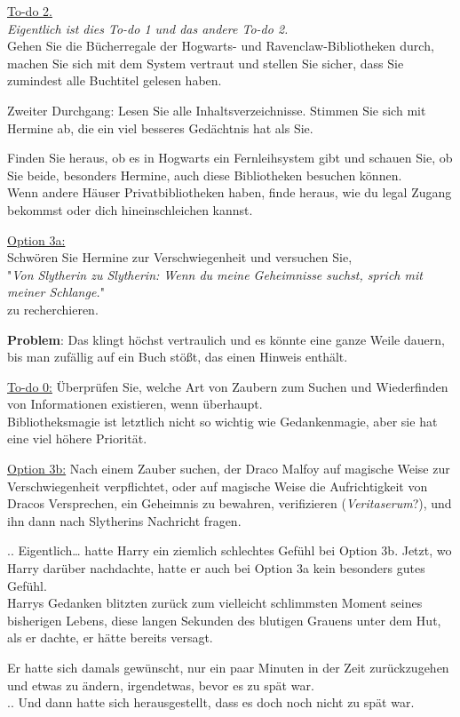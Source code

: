 {\uline{To-do 2.}\\ \emph{Eigentlich ist dies To-do 1 und das andere To-do 2.}\\ Gehen Sie die Bücherregale der Hogwarts- und Ravenclaw-Bibliotheken durch, machen Sie sich mit dem System vertraut und stellen Sie sicher, dass Sie zumindest alle Buchtitel gelesen haben.

Zweiter Durchgang: Lesen Sie alle Inhaltsverzeichnisse. Stimmen Sie sich mit Hermine ab, die ein viel besseres Gedächtnis hat als Sie.

Finden Sie heraus, ob es in Hogwarts ein Fernleihsystem gibt und schauen Sie, ob Sie beide, besonders Hermine, auch diese Bibliotheken besuchen können.\\ Wenn andere Häuser Privatbibliotheken haben, finde heraus, wie du legal Zugang bekommst oder dich hineinschleichen kannst.

\uline{Option 3a:}\\ Schwören Sie Hermine zur Verschwiegenheit und versuchen Sie,\\ "\emph{Von Slytherin zu Slytherin: Wenn du meine Geheimnisse suchst, sprich mit meiner Schlange.}"\\ zu recherchieren.

\textbf{Problem}: Das klingt höchst vertraulich und es könnte eine ganze Weile dauern, bis man zufällig auf ein Buch stößt, das einen Hinweis enthält.

\uline{To-do 0:} Überprüfen Sie, welche Art von Zaubern zum Suchen und Wiederfinden von Informationen existieren, wenn überhaupt.\\ Bibliotheksmagie ist letztlich nicht so wichtig wie Gedankenmagie, aber sie hat eine viel höhere Priorität.

\uline{Option 3b:} Nach einem Zauber suchen, der Draco Malfoy auf magische Weise zur Verschwiegenheit verpflichtet, oder auf magische Weise die Aufrichtigkeit von Dracos Versprechen, ein Geheimnis zu bewahren, verifizieren (\emph{Veritaserum}?), und ihn dann nach Slytherins Nachricht fragen.

.. Eigentlich… hatte Harry ein ziemlich schlechtes Gefühl bei Option 3b. Jetzt, wo Harry darüber nachdachte, hatte er auch bei Option 3a kein besonders gutes Gefühl.\\ Harrys Gedanken blitzten zurück zum vielleicht schlimmsten Moment seines bisherigen Lebens, diese langen Sekunden des blutigen Grauens unter dem Hut, als er dachte, er hätte bereits versagt.

Er hatte sich damals gewünscht, nur ein paar Minuten in der Zeit zurückzugehen und etwas zu ändern, irgendetwas, bevor es zu spät war.\\ .. Und dann hatte sich herausgestellt, dass es doch noch nicht zu spät war.

}
